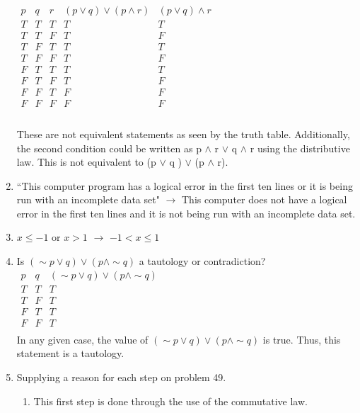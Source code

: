 \documentclass{article}
\makeatletter
\newcommand\setItemnumber[1]{\setcounter{enum\romannumeral\@enumdepth}{\numexpr#1-1\relax}}
\makeatother
\begin{document}
\begin{enumerate}
\begin{math}
  \begin{array}{|ccc|c|c|}
    p&q&r& (p \lor q ) \lor (p \land r) & (p \lor q ) \land r \\
    \hline
    T&T&T &T &T \\
    T&T&F &T &F\\
    T&F&T &T &T\\
    T&F&F &T &F\\
    F&T&T &T &T\\
    F&T&F &T &F\\
    F&F&T &F &F\\
    F&F&F &F &F\\
  \end{array}
  \end{math}
  \\
  \\
  These are not equivalent statements as seen by the truth table. Additionally, the second condition could be written as p $\land$ r $\lor$ q $\land$ r using the distributive law. This is not equivalent to (p $\lor$ q ) $\lor$ (p $\land$ r).
  \setItemnumber{29}
  \item ``This computer program has a logical error in the first ten lines or it is being run with an incomplete data set" $\rightarrow$ This computer does not have a logical error in the first ten lines and it is not being run with an incomplete data set.
  \setItemnumber{35}
  \item $x\leq -1$ or $x>1$ $\rightarrow$ $-1<x\leq1$
  \setItemnumber{43}
  \item Is $(\sim p \lor q) \lor (p \land \sim q)$ a tautology or contradiction?\\
  \begin{math} 
  \begin{array}{|cc|c|}
    p&q& (\sim p \lor q) \lor (p \land \sim q)\\
    \hline
    T&T &T \\
    T&F &T \\
    F&T &T \\
    F&F &T \\
  \end{array}
  \end{math}
  \\
  In any given case, the value of $(\sim p \lor q) \lor (p \land \sim q)$ is true. Thus, this statement is a tautology. 
  \setItemnumber{49}
  \item Supplying a reason for each step on problem 49.
  \begin{enumerate}
      \item This first step is done through the use of the commutative law.

\end{enumerate}
\end{enumerate}
\end{document}

